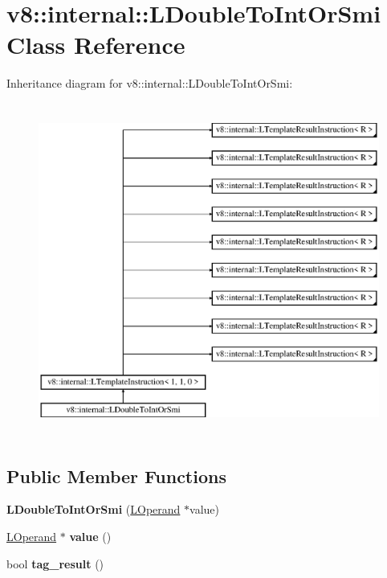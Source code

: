 \hypertarget{classv8_1_1internal_1_1_l_double_to_int_or_smi}{}\section{v8\+:\+:internal\+:\+:L\+Double\+To\+Int\+Or\+Smi Class Reference}
\label{classv8_1_1internal_1_1_l_double_to_int_or_smi}
Inheritance diagram for v8\+:\+:internal\+:\+:L\+Double\+To\+Int\+Or\+Smi\+:\begin{figure}[H]
\begin{center}
\leavevmode
\includegraphics[height=11.000000cm]{classv8_1_1internal_1_1_l_double_to_int_or_smi}
\end{center}
\end{figure}
\subsection*{Public Member Functions}
\begin{DoxyCompactItemize}
\item 
{\bfseries L\+Double\+To\+Int\+Or\+Smi} (\hyperlink{classv8_1_1internal_1_1_l_operand}{L\+Operand} $\ast$value)\hypertarget{classv8_1_1internal_1_1_l_double_to_int_or_smi_a2cc0f0307b413d7f423e8e08ee564f09}{}\label{classv8_1_1internal_1_1_l_double_to_int_or_smi_a2cc0f0307b413d7f423e8e08ee564f09}

\item 
\hyperlink{classv8_1_1internal_1_1_l_operand}{L\+Operand} $\ast$ {\bfseries value} ()\hypertarget{classv8_1_1internal_1_1_l_double_to_int_or_smi_a0400faa60b92f416a6da96e5ba06f4f7}{}\label{classv8_1_1internal_1_1_l_double_to_int_or_smi_a0400faa60b92f416a6da96e5ba06f4f7}

\item 
bool {\bfseries tag\+\_\+result} ()\hypertarget{classv8_1_1internal_1_1_l_double_to_int_or_smi_a5736aae19ca71a46cbbb19524f587003}{}\label{classv8_1_1internal_1_1_l_double_to_int_or_smi_a5736aae19ca71a46cbbb19524f587003}

\end{DoxyCompactItemize}

